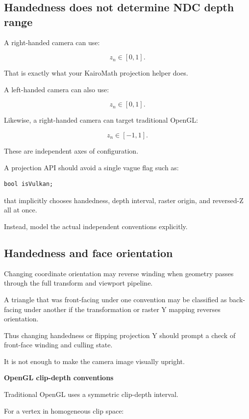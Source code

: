 \subsection{Handedness does not determine NDC depth range}\label{02-foundations-ii-ch033-handedness-does-not-determine-ndc-depth-range}

A right-handed camera can use:

\[
 z_n\in[0,1].
\]

That is exactly what your KairoMath projection helper does.

A left-handed camera can also use:

\[
 z_n\in[0,1].
\]

Likewise, a right-handed camera can target traditional OpenGL:

\[
 z_n\in[-1,1].
\]

These are independent axes of configuration.

A projection API should avoid a single vague flag such as:

\begin{verbatim}
bool isVulkan;
\end{verbatim}

that implicitly chooses handedness, depth interval, raster origin, and reversed-Z all at once.

Instead, model the actual independent conventions explicitly.

\subsection{Handedness and face orientation}\label{02-foundations-ii-ch033-handedness-and-face-orientation}

Changing coordinate orientation may reverse winding when geometry passes through the full transform and viewport pipeline.

A triangle that was front-facing under one convention may be classified as back-facing under another if the transformation or raster Y mapping reverses orientation.

Thus changing handedness or flipping projection Y should prompt a check of front-face winding and culling state.

It is not enough to make the camera image visually upright.

\textbf{OpenGL clip-depth conventions}

Traditional OpenGL uses a symmetric clip-depth interval.

For a vertex in homogeneous clip space:

